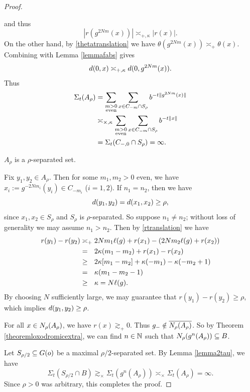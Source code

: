 \begin{proof}
\begin{subproof}
\[\]
and thus
\[
|r(g^{2Nm}(x))| \asymp_{\plus,\kappa} |r(x)|.
\]
On the other hand, by \eqref{thetatranslation} we have $\theta(g^{2Nm}(x)) \asymp_\plus \theta(x)$. Combining with Lemma \ref{lemmafabs} gives
\[
d(0,x) \asymp_{+,\kappa} d(0,g^{2Nm}(x)).
\]
Thus
\begin{align*}
\Sigma_t(A_\rho)
&= \sum_{\substack{m > 0 \\ \textup{even}}}\sum_{x\in C_{-m}\cap S_\rho} b^{-t\|g^{2Nm}(x)\|}\\
&\asymp_{\times,\kappa} \sum_{\substack{m > 0 \\ \textup{even}}}\sum_{x\in C_{-m}\cap S_\rho} b^{-t\|x\|}\\
&= \Sigma_t(C_{-,0}\cap S_\rho) = \infty.
\end{align*}
\end{subproof}
\begin{claim}
$A_\rho$ is a $\rho$-separated set.
\end{claim}
\begin{subproof}
Fix $y_1,y_2\in A_\rho$. Then for some $m_1,m_2 > 0$ even, we have $x_i := g^{-2Nm_i}(y_i)\in C_{-m_i}$ ($i = 1,2$). If $n_1 = n_2$, then we have
\[
d(y_1,y_2) = d(x_1,x_2) \geq \rho,
\]
since $x_1,x_2\in S_\rho$ and $S_\rho$ is $\rho$-separated. So suppose $n_1\neq n_2$; without loss of generality we may assume $n_1 > n_2$. Then by \eqref{rtranslation} we have
\begin{align*}
r(y_1) - r(y_2) &\asymp_\plus 2Nm_1\ell(g) + r(x_1) - (2Nm_2\ell(g) + r(x_2))\\
&=_\pt 2\kappa(m_1 - m_2) + r(x_1) - r(x_2)\\
&\geq_\pt 2\kappa[m_1 - m_2] + \kappa(-m_1) - \kappa(-m_2 + 1)\\
&=_\pt \kappa(m_1 - m_2 - 1)\\
&\geq_\pt \kappa = N\ell(g).
\end{align*}
By choosing $N$ sufficiently large, we may guarantee that $r(y_1) - r(y_2)\geq \rho$, which implies $d(y_1,y_2)\geq \rho$.
\end{subproof}

For all $x\in N_\rho(A_\rho)$, we have $r(x)\gtrsim_\plus 0$. Thus $g_-\notin \overline{N_\rho(A_\rho)}$. So by Theorem \ref{theoremloxodromicextra}, we can find $n\in\N$ such that $N_\rho(g^n(A_\rho))\subseteq B$.

Let $S_{\rho/2}\subseteq G(o)$ be a maximal $\rho/2$-separated set. By Lemma \ref{lemma2tau}, we have
\[
\Sigma_t(S_{\rho/2}\cap B) \gtrsim_\times \Sigma_t(g^n(A_\rho)) \asymp_\times \Sigma_t(A_\rho) = \infty.
\]
Since $\rho > 0$ was arbitrary, this completes the proof.
\end{proof}




